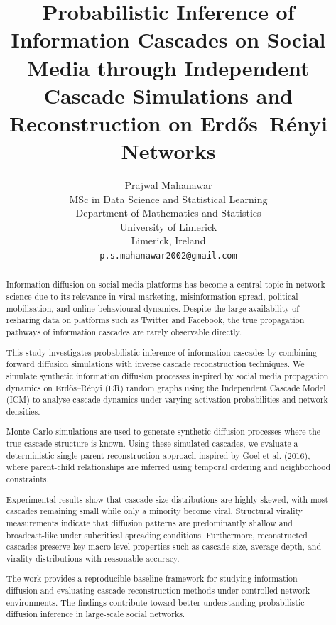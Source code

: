 \documentclass{article}
\title{Probabilistic Inference of Information Cascades on Social Media through Independent Cascade Simulations and Reconstruction on Erd\H{o}s--R\'enyi Networks}
\author{
Prajwal Mahanawar \\
MSc in Data Science and Statistical Learning \\
Department of Mathematics and Statistics \\
University of Limerick \\
Limerick, Ireland \\
\texttt{p.s.mahanawar2002@gmail.com}
}
\begin{document}
\maketitle

\begin{abstract}

Information diffusion on social media platforms has become a central topic in network science due to its relevance in viral marketing, misinformation spread, political mobilisation, and online behavioural dynamics. Despite the large availability of resharing data on platforms such as Twitter and Facebook, the true propagation pathways of information cascades are rarely observable directly.

This study investigates probabilistic inference of information cascades by combining forward diffusion simulations with inverse cascade reconstruction techniques. We simulate synthetic information diffusion processes inspired by social media propagation dynamics on Erd\H{o}s--R\'enyi (ER) random graphs using the Independent Cascade Model (ICM) to analyse cascade dynamics under varying activation probabilities and network densities.

Monte Carlo simulations are used to generate synthetic diffusion processes where the true cascade structure is known. Using these simulated cascades, we evaluate a deterministic single-parent reconstruction approach inspired by Goel et al. (2016), where parent-child relationships are inferred using temporal ordering and neighborhood constraints.

Experimental results show that cascade size distributions are highly skewed, with most cascades remaining small while only a minority become viral. Structural virality measurements indicate that diffusion patterns are predominantly shallow and broadcast-like under subcritical spreading conditions. Furthermore, reconstructed cascades preserve key macro-level properties such as cascade size, average depth, and virality distributions with reasonable accuracy.

The work provides a reproducible baseline framework for studying information diffusion and evaluating cascade reconstruction methods under controlled network environments. The findings contribute toward better understanding probabilistic diffusion inference in large-scale social networks.

\end{abstract}

\end{document}
